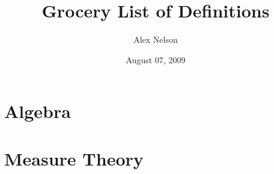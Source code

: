 \documentclass[draft]{amsbook}
\title{Grocery List of Definitions}
\date{August 07, 2009}
\author{Alex Nelson}
\begin{document}
\maketitle
\chapter{Algebra}

\chapter{Measure Theory}




\nocite{*}


\end{document}
